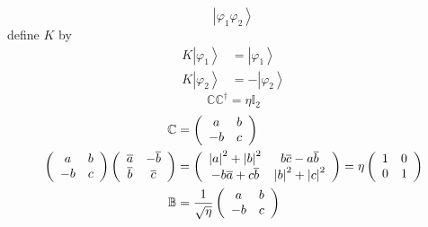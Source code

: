 \documentclass[aps,preprint]{revtex4}%
\begin{document}
\begin{equation}
\left\vert \varphi_{1}\varphi_{2}\right\rangle
\end{equation}
define $K$ by
\begin{align}
K\left\vert \varphi_{1}\right\rangle  & =\left\vert \varphi_{1}\right\rangle
\\
K\left\vert \varphi_{2}\right\rangle  & =-\left\vert \varphi_{2}\right\rangle
\end{align}%
\begin{equation}
\mathbb{CC}^{\dagger}=\eta\mathbb{I}_{2}%
\end{equation}%
\begin{align}
\mathbb{C}  & =\left(
\begin{array}
[c]{cc}%
a & b\\
-b & c
\end{array}
\right)  \\
\left(
\begin{array}
[c]{cc}%
a & b\\
-b & c
\end{array}
\right)  \left(
\begin{array}
[c]{cc}%
\overline{a} & -\overline{b}\\
\overline{b} & \overline{c}%
\end{array}
\right)    & =\left(
\begin{array}
[c]{cc}%
\left\vert a\right\vert ^{2}+\left\vert b\right\vert ^{2} & b\overline
{c}-a\overline{b}\\
-b\overline{a}+c\overline{b} & \left\vert b\right\vert ^{2}+\left\vert
c\right\vert ^{2}%
\end{array}
\right)  =\eta\left(
\begin{array}
[c]{cc}%
1 & 0\\
0 & 1
\end{array}
\right)  \\
\mathbb{B}  & =\frac{1}{\sqrt{\eta}}\left(
\begin{array}
[c]{cc}%
a & b\\
-b & c
\end{array}
\right)
\end{align}
%
\end{document}
